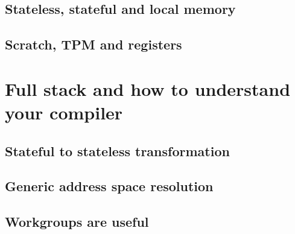 \documentclass[a4paper,12pt,oneside]{article}
\begin{document}

\subsection{Stateless, stateful and local memory}\label{subsec:StatelessFull}


\subsection{Scratch, TPM and registers}\label{subsec:ScratchTPM}


\section{Full stack and how to understand your compiler}\label{sec:Compiler}


\subsection{Stateful to stateless transformation}\label{subsec:ToStateless}


\subsection{Generic address space resolution}\label{subsec:GenAddr}


\subsection{Workgroups are useful}\label{subsec:Wgroups}

\end{document}
